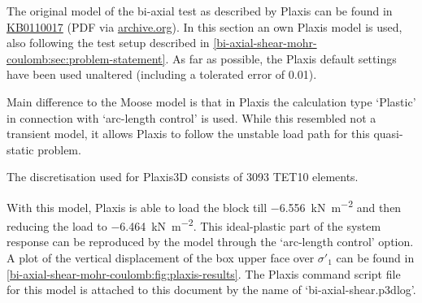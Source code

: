 The original model of the bi-axial test as described by Plaxis can be found in
\href{https://bentleysystems.service-now.com/community?id=kb\_article\_view&sysparm_article=KB0110017}{KB0110017}
(PDF via
\href{https://web.archive.org/web/20230926091632/https://communities.bentley.com/cfs-file/\_\_key/communityserver-wikis-components-files/00-00-00-05-58/PlxValidation\_2D00\_Bi\_2D00\_axial\_5F00\_compression\_5F00\_test\_5F00\_with\_5F00\_Mohr\_2D00\_Coulomb\_5F00\_model\_2D00\_2018.pdf}{archive.org}).
In this section an own Plaxis model is used, also following the test setup
described in \autoref{bi-axial-shear-mohr-coulomb:sec:problem-statement}. As
far as possible, the Plaxis default settings have been used unaltered
(including a tolerated error of \qty{0.01}{}).

Main difference to the Moose model is that in Plaxis the calculation type
‘Plastic’ in connection with ‘arc-length control’ is used. While this resembled
not a transient model, it allows Plaxis to follow the unstable load path for
this quasi-static problem.

The discretisation used for Plaxis3D consists of 3093 TET10 elements.

With this model, Plaxis is able to load the block till
\qty{-6.556}{\kilo\newton\per\square\metre} and then reducing the load to
\qty{-6.464}{\kilo\newton\per\square\metre}. This ideal-plastic part of the
system response can be reproduced by the model through the ‘arc-length control’
option. A plot of the vertical displacement of the box upper face over
$\sigma'_1$ can be found in
\autoref{bi-axial-shear-mohr-coulomb:fig:plaxis-results}. The Plaxis command
script file for this model is attached to this document by the name of
‘bi-axial-shear.p3dlog’.


